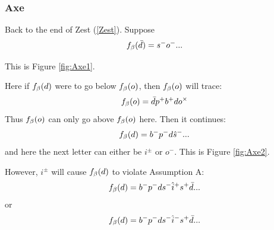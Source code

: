 







\subsubsection{Axe}\label{Axe}
Back to the end of Zest (\ref{Zest}). Suppose 
\[
f_\beta(\bar{d}) = s^- o^-...
\]

This is Figure \ref{fig:Axe1}.

Here if $f_\beta(d)$ were to go below $f_\beta(o)$, then $f_\beta(o)$ will trace:
\[
f_\beta(o) = \bar{d} p^+ b^+ d o^\times
\]
Thus $f_\beta(o)$ can only go above $f_\beta(o)$ here. Then it continues:
\[
f_\beta(d) = b^- p^- d \hat{s}^-...
\]
and here the next letter can either be $i^\pm$ or $o^-$. This is Figure \ref{fig:Axe2}.

However, $i^\pm$ will cause $f_\beta(d)$ to violate Assumption A:
\[
f_\beta(d) = b^- p^- d s^- \hat{i}^+ s^+ \bar{d}...
\]
or
\[
f_\beta(d) = b^- p^- d s^- \hat{i}^- s^+ \bar{d}...
\]

